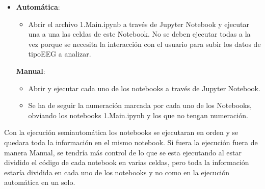   \begin{itemize}
   \tightlist
   \item
    \textbf{Automática}: 
    \begin{itemize}

   \tightlist
   \item
    Abrir el archivo 1.Main.ipynb a través de Jupyter Notebook y ejecutar una a una las celdas de este Notebook. No se deben ejecutar todas a la vez porque se necesita la interacción con el usuario para subir los datos de tipoEEG a analizar.
   \end{itemize}

    \textbf{Manual}: 
  \begin{itemize}
   \tightlist
   \item
    Abrir y ejecutar cada uno de los notebooks a través de Jupyter Notebook. 
   \item
    Se ha de seguir la numeración marcada por cada uno de los Notebooks, obviando los notebooks 1.Main.ipynb y los que no tengan numeración.
   \end{itemize}   
  \end{itemize} 
 

Con la ejecución semiautomática los notebooks se ejecutaran en orden y se quedara toda la información en el mismo notebook.
Si fuera la ejecución fuera de manera Manual, se tendría más control de lo que se esta ejecutando al estar dividido el código de cada notebook en varias celdas, pero toda la información estaría dividida en cada uno de los notebooks y no como en la ejecución automática en un solo.



